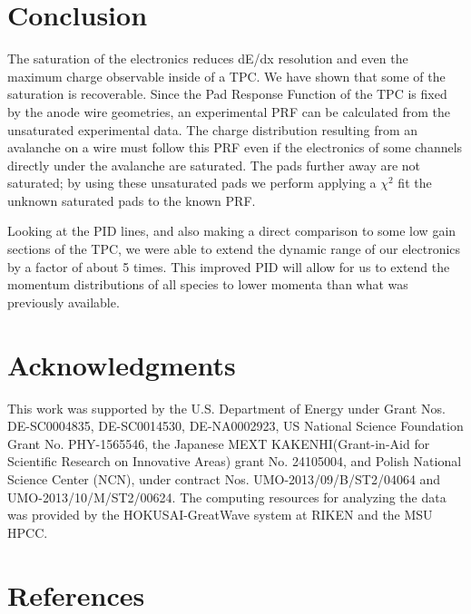 \documentclass[review]{elsarticle}
\begin{document}

\section{Conclusion}

The saturation  of the electronics reduces dE/dx resolution and even the maximum charge observable inside of a TPC.  We have shown that some of the saturation is recoverable. Since the Pad Response Function of the TPC is fixed by the anode wire geometries, an experimental PRF can be calculated from the unsaturated experimental data. The charge distribution resulting from an avalanche on a wire must follow this PRF even if the electronics of some channels directly under the avalanche are saturated. The pads further away are not saturated; by using these unsaturated pads we perform applying a $\chi^2$  fit the unknown saturated pads to the known PRF. 

Looking at the PID lines, and also making a direct comparison to some low gain sections of the TPC, we were able to extend the dynamic range of our electronics by a factor of about 5 times. This improved PID will allow for us to extend the momentum distributions of all species to lower momenta than what was previously available. 

\section{Acknowledgments}
This work was supported by the U.S. Department of Energy under Grant Nos.  DE-SC0004835,  DE-SC0014530, DE-NA0002923,  US  National Science Foundation Grant  No.  PHY-1565546, the  Japanese  MEXT  KAKENHI(Grant-in-Aid  for  Scientific  Research  on  Innovative  Areas)  grant  No. 24105004, and Polish National Science Center (NCN), under contract Nos. UMO-2013/09/B/ST2/04064 and UMO-2013/10/M/ST2/00624. The computing resources for analyzing the data was provided by the HOKUSAI-GreatWave system at RIKEN and the MSU HPCC. 

\section*{References}


\end{document}
